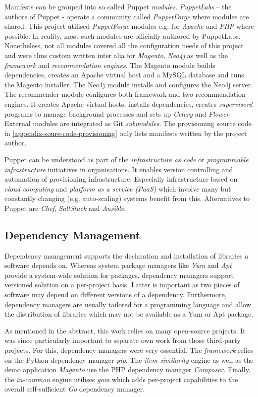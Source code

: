 Manifests can be grouped into so called Puppet \emph{modules}. \emph{PuppetLabs} -- the authors of Puppet - operate a community called \emph{PuppetForge} where modules are shared. This project utilised \emph{PuppetForge} modules e.g. for \emph{Apache} and \emph{PHP} where possible. In reality, most such modules are officially authored by PuppetLabs. Nonetheless, not all modules covered all the configuration needs of this project and were thus custom written inter alia for \emph{Magento}, \emph{Neo4j} as well as the \emph{framework} and \emph{recommendation engines}. The Magento module builds dependencies, creates an Apache virtual host and a MySQL database and runs the Magento installer. The Neo4j module installs and configures the Neo4j server. The recommender module configures both framework and two recommendation engines. It creates Apache virtual hosts, installs dependencies, creates \emph{supervisord} programs to manage background processes and sets up \emph{Celery} and \emph{Flower}. External modules are integrated as Git \emph{submodules}. The provisioning source code in \ref{appendix-soure-code-provisioning} only lists manifests written by the project author.

Puppet can be understood as part of the \emph{infrastructure as code} or \emph{programmable infrastructure} initiatives in organisations. It enables version controlling and automation of provisioning infrastructure. Especially infrastructure based on \emph{cloud computing} and \emph{platform as a service (PaaS)} which involve many but constantly changing (e.g. auto-scaling) systems benefit from this. Alternatives to Puppet are \emph{Chef}, \emph{SaltStack} and \emph{Ansible}.

\subsection{Dependency Management}

Dependency management supports the declaration and installation of libraries a software depends on. Whereas system package managers like \emph{Yum} and \emph{Apt} provide a system-wide solution for packages, dependency managers support versioned solution on a per-project basis. Latter is important as two pieces of software may depend on different versions of a dependency. Furthermore, dependency managers are usually tailored for a programming language and allow the distribution of libraries which may not be available as a Yum or Apt package.

As mentioned in the abstract, this work relies on many open-source projects. It was since particularly important to separate own work from those third-party projects. For this, dependency managers were very essential. The \emph{framework} relies on the Python dependency manager \emph{pip}. The \emph{item-similarity} engine as well as the demo application \emph{Magento} use the PHP dependency manager \emph{Composer}. Finally, the \emph{in-common} engine utilises \emph{gom} which adds per-project capabilities to the overall self-sufficient \emph{Go} dependency manager.